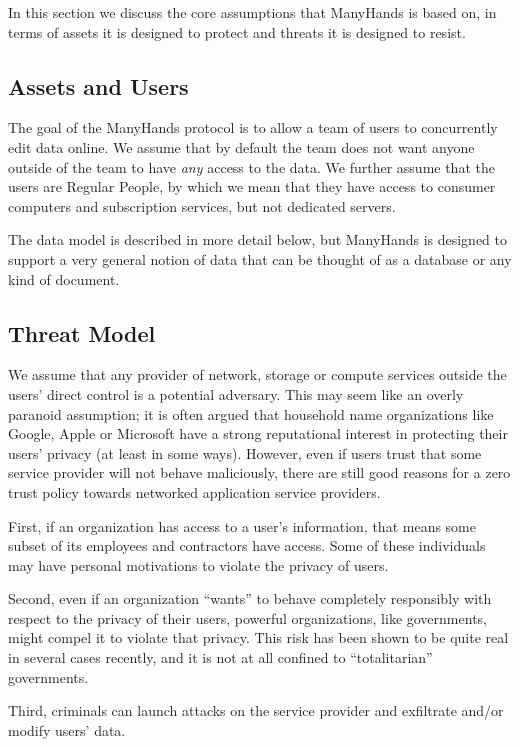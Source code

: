 \documentclass[pldi,10pt,preprint]{sigplanconf-pldi16}
\begin{document}
In this section we discuss the core assumptions that ManyHands is based on, in terms of assets it is designed to protect and threats it is designed to resist.

\subsection{Assets and Users}

The goal of the ManyHands protocol is to allow a team of users to concurrently edit data online.
We assume that by default the team does not want anyone outside of the team to have \emph{any} access to the data.
We further assume that the users are Regular People\texttrademark, by which we mean that they have access to consumer computers and subscription services, but not dedicated servers.

The data model is described in more detail below, but ManyHands is designed to support a very general notion of data that can be thought of as a database or any kind of document.

\subsection{Threat Model}

We assume that any provider of network, storage or compute services outside the users' direct control is a potential adversary.
This may seem like an overly paranoid assumption; it is often argued that household name organizations like Google, Apple or Microsoft have a strong reputational interest in protecting their users' privacy (at least in some ways).
However, even if users trust that some service provider will not behave maliciously, there are still good reasons for a zero trust policy towards networked application service providers.

First, if an organization has access to a user's information, that means some subset of its employees and contractors have access.
Some of these individuals may have personal motivations to violate the privacy of users.

Second, even if an organization ``wants'' to behave completely responsibly with respect to the privacy of their users, powerful organizations, like governments, might compel it to violate that privacy.
This risk has been shown to be quite real in several cases recently, and it is not at all confined to ``totalitarian'' governments.

Third, criminals can launch attacks on the service provider and exfiltrate and/or modify users' data.
\end{document}

